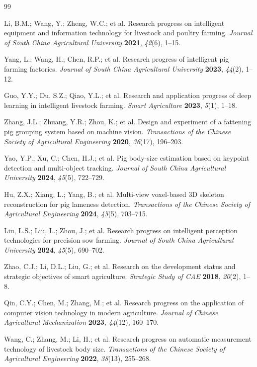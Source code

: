 \documentclass[computers,article,submit,pdftex,moreauthors]{mdpi}
\begin{document}
\begin{thebibliography}{99}

 Li, B.M.; Wang, Y.; Zheng, W.C.; et al. Research progress on intelligent equipment and information technology for livestock and poultry farming. \textit{Journal of South China Agricultural University} \textbf{2021}, \textit{42}(6), 1--15.

 Yang, L.; Wang, H.; Chen, R.P.; et al. Research progress of intelligent pig farming factories. \textit{Journal of South China Agricultural University} \textbf{2023}, \textit{44}(2), 1--12.

 Guo, Y.Y.; Du, S.Z.; Qiao, Y.L.; et al. Research and application progress of deep learning in intelligent livestock farming. \textit{Smart Agriculture} \textbf{2023}, \textit{5}(1), 1--18.

 Zhang, J.L.; Zhuang, Y.R.; Zhou, K.; et al. Design and experiment of a fattening pig grouping system based on machine vision. \textit{Transactions of the Chinese Society of Agricultural Engineering} \textbf{2020}, \textit{36}(17), 196--203.

 Yao, Y.P.; Xu, C.; Chen, H.J.; et al. Pig body-size estimation based on keypoint detection and multi-object tracking. \textit{Journal of South China Agricultural University} \textbf{2024}, \textit{45}(5), 722--729.

 Hu, Z.X.; Xiang, L.; Yang, B.; et al. Multi-view voxel-based 3D skeleton reconstruction for pig lameness detection. \textit{Transactions of the Chinese Society of Agricultural Engineering} \textbf{2024}, \textit{45}(5), 703--715.

 Liu, L.S.; Liu, L.; Zhou, J.; et al. Research progress on intelligent perception technologies for precision sow farming. \textit{Journal of South China Agricultural University} \textbf{2024}, \textit{45}(5), 690--702.

 Zhao, C.J.; Li, D.L.; Liu, G.; et al. Research on the development status and strategic objectives of smart agriculture. \textit{Strategic Study of CAE} \textbf{2018}, \textit{20}(2), 1--8.

 Qin, C.Y.; Chen, M.; Zhang, M.; et al. Research progress on the application of computer vision technology in modern agriculture. \textit{Journal of Chinese Agricultural Mechanization} \textbf{2023}, \textit{44}(12), 160--170.

 Wang, C.; Zhang, M.; Li, H.; et al. Research progress on automatic measurement technology of livestock body size. \textit{Transactions of the Chinese Society of Agricultural Engineering} \textbf{2022}, \textit{38}(13), 255--268.


\end{thebibliography}
\end{document}
